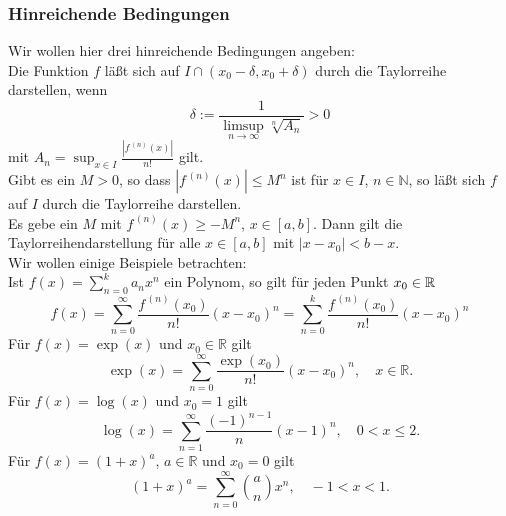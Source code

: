 \documentclass[fontsize=12pt,paper=a4,twoside,bibtotoc,idxtotoc,
liststotoc,pagesize,BCOR1.2cm,DIV15,chapterprefix,pagesize=pdftex]{scrbook}
\theoremstyle{plain}
\theoremstyle{definition}
\theoremstyle{remark}
\begin{document}
\subsubsection{Hinreichende Bedingungen}
Wir wollen hier drei hinreichende Bedingungen angeben:\\
Die Funktion $f$ läßt sich auf $I\cap (x_0-\delta, x_0+\delta)$ durch die Taylorreihe darstellen, wenn
\[
\delta:= \frac{1}{\limsup_{n \rightarrow \infty} \sqrt[n]{A_n}}>0
 \]
mit $A_n=\sup_{x \in I}  \frac{|f^{\,(n)}(x)|}{n!}$ gilt.\\
Gibt es ein $M>0$, so dass $|f^{\,(n)}(x)|\leq M^n$ ist für $x \in
I$, $n \in \mathbb{N}$, so läßt sich $f$ auf $I$ durch die Taylorreihe
darstellen.\\
 Es gebe ein $M$ mit  $f^{\,(n)}(x)\geq -M^n$, $x \in [a,b]$. Dann
gilt die Taylorreihendarstellung für alle $x \in [a,b]$ mit
$|x-x_0|<b-x$.\\ 
Wir wollen einige Beispiele betrachten:\\
Ist $f(x) = \sum_{n=0}^k a_n x^n$ ein Polynom, so gilt für jeden Punkt $x_0 \in \mathbb{R}$
\[
 f(x) = \sum_{n=0}^\infty \frac{f^{\,(n)}(x_0)}{n!}(x-x_0)^n 
 = \sum_{n=0}^k  \frac{f^{\,(n)}(x_0)}{n!}(x-x_0)^n
\]
 Für $f(x)=\exp(x)$ und $x_0 \in \mathbb{R}$ gilt 
\[ \exp(x)= \sum_{n=0}^\infty \frac{\exp(x_0)}{n!} (x-x_0)^n, \quad x
\in \mathbb{R}.\]
 Für $f(x)=\log(x)$ und $x_0=1$ gilt
\[ \log (x) = \sum_{n=1}^\infty \frac{(-1)^{n-1}}{n}(x-1)^n, \quad 0 <
x \leq 2.\]
 Für $f(x)= (1+x)^a$, $a\in \mathbb{R}$  und $x_0=0$ gilt
\[ (1+x)^a= \sum_{n =0}^\infty \binom{a}{n}{x^n}, \quad -1 <
x < 1. \]
\end{document}
